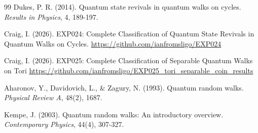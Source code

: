 \documentclass[12pt]{article}
\begin{document}
\begin{thebibliography}{99}
Dukes, P. R. (2014). Quantum state revivals in quantum walks on cycles. \textit{Results in Physics}, 4, 189-197.

Craig, I. (2026). EXP024: Complete Classification of Quantum State Revivals in Quantum Walks on Cycles. \url{https://github.com/ianfromsligo/EXP024}

Craig, I. (2026). EXP025: Complete Classification of Separable Quantum Walks on Tori \url{https://github.com/ianfromsligo/EXP025_tori_separable_coin_results}

Aharonov, Y., Davidovich, L., \& Zagury, N. (1993). Quantum random walks. \textit{Physical Review A}, 48(2), 1687.

Kempe, J. (2003). Quantum random walks: An introductory overview. \textit{Contemporary Physics}, 44(4), 307-327.
\end{thebibliography}
\end{document}
